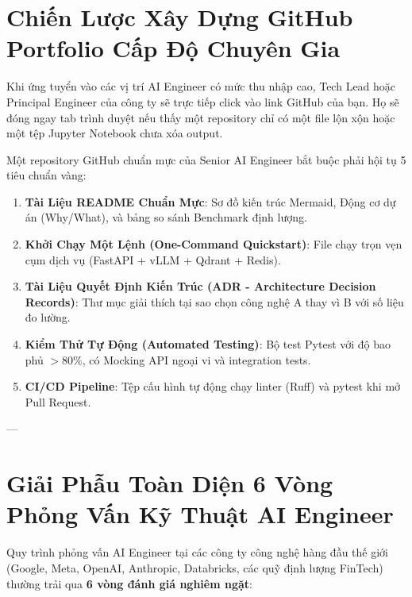 \section{Chiến Lược Xây Dựng GitHub Portfolio Cấp Độ Chuyên Gia}
\label{sec:ch15-github-portfolio}

Khi ứng tuyển vào các vị trí AI Engineer có mức thu nhập cao, Tech Lead hoặc Principal Engineer của công ty sẽ trực tiếp click vào link GitHub của bạn. Họ sẽ đóng ngay tab trình duyệt nếu thấy một repository chỉ có một file  lộn xộn hoặc một tệp Jupyter Notebook chưa xóa output.

Một repository GitHub chuẩn mực của Senior AI Engineer bắt buộc phải hội tụ 5 tiêu chuẩn vàng:
\begin{enumerate}
  \item \textbf{Tài Liệu README Chuẩn Mực}: Sơ đồ kiến trúc Mermaid, Động cơ dự án (Why/What), và bảng so sánh Benchmark định lượng.
  \item \textbf{Khởi Chạy Một Lệnh (One-Command Quickstart)}: File  chạy trọn vẹn cụm dịch vụ (FastAPI + vLLM + Qdrant + Redis).
  \item \textbf{Tài Liệu Quyết Định Kiến Trúc (ADR - Architecture Decision Records)}: Thư mục  giải thích tại sao chọn công nghệ A thay vì B với số liệu đo lường.
  \item \textbf{Kiểm Thử Tự Động (Automated Testing)}: Bộ test Pytest với độ bao phủ $> 80\%$, có Mocking API ngoại vi và integration tests.
  \item \textbf{CI/CD Pipeline}: Tệp cấu hình  tự động chạy linter (Ruff) và pytest khi mở Pull Request.
\end{enumerate}

---

\section{Giải Phẫu Toàn Diện 6 Vòng Phỏng Vấn Kỹ Thuật AI Engineer}
\label{sec:ch15-interview-breakdown}

Quy trình phỏng vấn AI Engineer tại các công ty công nghệ hàng đầu thế giới (Google, Meta, OpenAI, Anthropic, Databricks, các quỹ định lượng FinTech) thường trải qua \textbf{6 vòng đánh giá nghiêm ngặt}:

